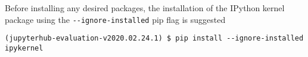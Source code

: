 Before installing any desired packages, the installation of the IPython kernel package using the \verb|--ignore-installed| pip flag is suggested
%
\begin{verbatim}
(jupyterhub-evaluation-v2020.02.24.1) $ pip install --ignore-installed ipykernel
\end{verbatim}
%
